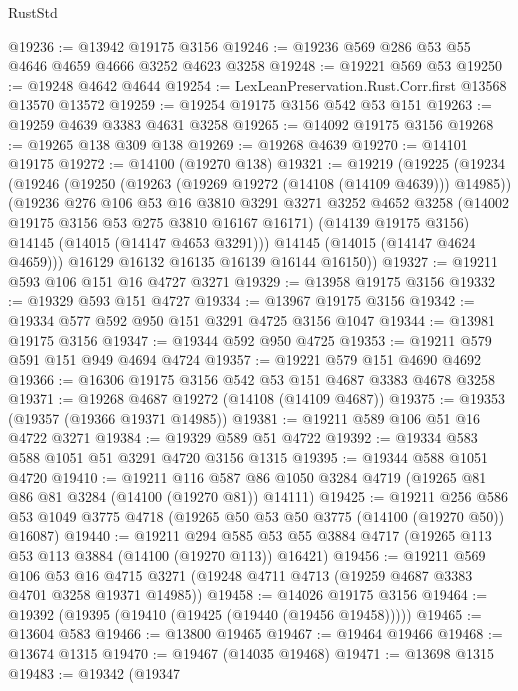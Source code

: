 \begin{lexlean}{RustStd}
\begin{coremodule}
@19236 := @13942 @19175 @3156
@19246 := @19236 @569 @286 @53 @55 @4646 @4659 @4666 @3252 @4623 @3258
@19248 := @19221 @569 @53
@19250 := @19248 @4642 @4644
@19254 := LexLeanPreservation.Rust.Corr.first @13568 @13570 @13572
@19259 := @19254 @19175 @3156 @542 @53 @151
@19263 := @19259 @4639 @3383 @4631 @3258
@19265 := @14092 @19175 @3156
@19268 := @19265 @138 @309 @138
@19269 := @19268 @4639
@19270 := @14101 @19175
@19272 := @14100 (@19270 @138)
@19321 := @19219
    (@19225
      (@19234
        (@19246
          (@19250 (@19263 (@19269 @19272 (@14108 (@14109 @4639))) @14985))
          (@19236
            @276
            @106
            @53
            @16
            @3810
            @3291
            @3271
            @3252
            @4652
            @3258
            (@14002 @19175 @3156 @53 @275 @3810 @16167 @16171)
            (@14139 @19175 @3156)
            @14145
            (@14015 (@14147 @4653 @3291)))
          @14145
          (@14015 (@14147 @4624 @4659)))
        @16129
        @16132
        @16135
        @16139
        @16144
        @16150))
@19327 := @19211 @593 @106 @151 @16 @4727 @3271
@19329 := @13958 @19175 @3156
@19332 := @19329 @593 @151 @4727
@19334 := @13967 @19175 @3156
@19342 := @19334 @577 @592 @950 @151 @3291 @4725 @3156 @1047
@19344 := @13981 @19175 @3156
@19347 := @19344 @592 @950 @4725
@19353 := @19211 @579 @591 @151 @949 @4694 @4724
@19357 := @19221 @579 @151 @4690 @4692
@19366 := @16306 @19175 @3156 @542 @53 @151 @4687 @3383 @4678 @3258
@19371 := @19268 @4687 @19272 (@14108 (@14109 @4687))
@19375 := @19353 (@19357 (@19366 @19371 @14985))
@19381 := @19211 @589 @106 @51 @16 @4722 @3271
@19384 := @19329 @589 @51 @4722
@19392 := @19334 @583 @588 @1051 @51 @3291 @4720 @3156 @1315
@19395 := @19344 @588 @1051 @4720
@19410 := @19211
    @116
    @587
    @86
    @1050
    @3284
    @4719
    (@19265 @81 @86 @81 @3284 (@14100 (@19270 @81)) @14111)
@19425 := @19211
    @256
    @586
    @53
    @1049
    @3775
    @4718
    (@19265 @50 @53 @50 @3775 (@14100 (@19270 @50)) @16087)
@19440 := @19211
    @294
    @585
    @53
    @55
    @3884
    @4717
    (@19265 @113 @53 @113 @3884 (@14100 (@19270 @113)) @16421)
@19456 := @19211
    @569
    @106
    @53
    @16
    @4715
    @3271
    (@19248 @4711 @4713 (@19259 @4687 @3383 @4701 @3258 @19371 @14985))
@19458 := @14026 @19175 @3156
@19464 := @19392 (@19395 (@19410 (@19425 (@19440 (@19456 @19458)))))
@19465 := @13604 @583
@19466 := @13800 @19465
@19467 := @19464 @19466
@19468 := @13674 @1315
@19470 := @19467 (@14035 @19468)
@19471 := @13698 @1315
@19483 := @19342
    (@19347

\end{coremodule}
\end{lexlean}

